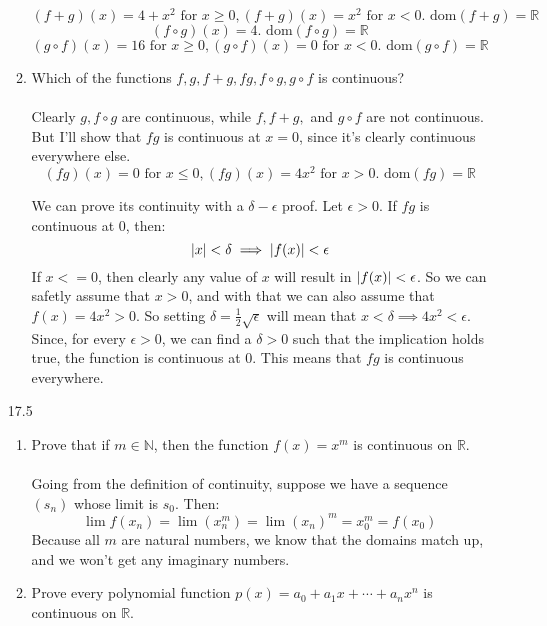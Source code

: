 \begin{enumerate}
\begin{enumerate}
        $$(f + g)(x) = 4+x^2 \text{ for } x \geq 0, (f+g)(x) = x^2 \text{ for } x < 0. \text{ dom}(f + g) = \mathds{R}$$
        $$(f \circ g)(x) = 4. \text{ dom}(f \circ g) = \mathds{R}$$
        $$(g \circ f)(x) = 16 \text{ for } x \geq 0, (g \circ f)(x) = 0 \text{ for } x < 0. \text { dom}(g \circ f) = \mathds{R}$$
      \item Which of the functions $f, g, f + g, fg, f \circ g, g \circ f$ is continuous?\\\\

        Clearly $g, f \circ g$ are continuous, while $f, f + g,$ and $g \circ f$ are not continuous. But I'll show that $fg$ is continuous at $x=0$, since it's clearly continuous everywhere else. 
        $$(fg)(x) = 0 \text { for } x \leq 0, (fg)(x) = 4x^2 \text{ for } x > 0. \text{ dom}(fg) = \mathds{R}$$

        We can prove its continuity with a $\delta - \epsilon$ proof. Let $\epsilon > 0$. If $fg$ is continuous at $0$, then:
        $$\left\vert x \right\vert < \delta \implies \left\vert f(x) \right\vert < \epsilon$$
        If $x <= 0$, then clearly any value of $x$ will result in $\left\vert f(x) \right\vert < \epsilon$. So we can safetly assume that $x > 0$, and with that we can also assume that $f(x) = 4x^2 > 0$. So setting $\delta = \frac{1}{2} \sqrt{\epsilon}$ will mean that $x < \delta \implies 4x^2 < \epsilon$. Since, for every $\epsilon > 0$, we can find a $\delta > 0$ such that the implication holds true, the function is continuous at $0$. This means that $fg$ is continuous everywhere.
    \end{enumerate}
  \item [17.5]
    \begin{enumerate}
      \item Prove that if $m \in \mathds{N}$, then the function $f(x) = x^m$ is continuous on $\mathds{R}$.\\\\

        Going from the definition of continuity, suppose we have a sequence $(s_n)$ whose limit is $s_0$. Then:
        $$\lim_{} f(x_n) = \lim_{} (x_n^m) = \lim_{}(x_n)^m = x_0^m = f(x_0)$$
        Because all $m$ are natural numbers, we know that the domains match up, and we won't get any imaginary numbers.
        
      \item Prove every polynomial function $p(x) = a_0 + a_1x + \cdots + a_nx^n$ is continuous on $\mathds{R}$.\\\\


\end{enumerate}
\end{enumerate}
